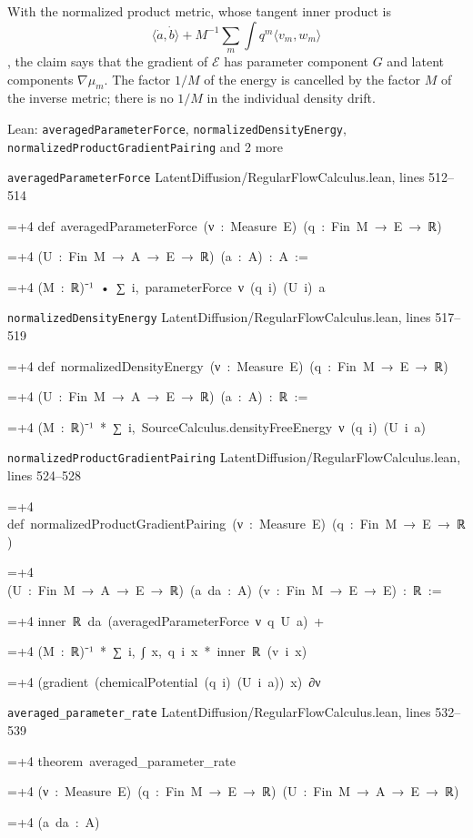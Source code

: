 \documentclass[11pt,a4paper]{report}
\newlength{\leancharwidth}
\newenvironment{leancode}{\par\smallskip\begingroup\ttfamily\footnotesize\raggedright
  \settowidth{\leancharwidth}{M}\setlength{\parskip}{0pt}\setlength{\parindent}{0pt}
  \frenchspacing}{\par\endgroup\smallskip}
\newcommand{\leanline}[2]{\hangindent=\dimexpr#1\leancharwidth+4\leancharwidth\relax
  \hangafter=1\noindent\hspace*{#1\leancharwidth}#2\par}
\newcommand{\leansource}[1]{\par{\footnotesize\color{leanmuted}#1}\par}
\begin{document}
With the normalized product metric, whose tangent inner product is \[\langle\dot a,\dot b\rangle+M^{-1}\sum_m\int q^m\langle v_m,w_m\rangle\], the claim says that the gradient of \(\mathcal E\) has parameter component \(G\) and latent components \(\nabla\mu_m\). The factor \(1/M\) of the energy is cancelled by the factor \(M\) of the inverse metric; there is no \(1/M\) in the individual density drift.

\begin{leanbox}{Lean: \texttt{averagedParameterForce}, \texttt{normalizedDensityEnergy}, \texttt{normalizedProductGradientPairing} and 2 more}
\leansource{\texttt{averagedParameterForce} \quad LatentDiffusion/\allowbreak{}RegularFlowCalculus.lean, lines 512–514}
\begin{leancode}
\leanline{0}{def\ averagedParameterForce\ (ν\ :\ Measure\ E)\ (q\ :\ Fin\ M\ →\ E\ →\ ℝ)}
\leanline{4}{(U\ :\ Fin\ M\ →\ A\ →\ E\ →\ ℝ)\ (a\ :\ A)\ :\ A\ :=}
\leanline{2}{(M\ :\ ℝ)⁻¹\ •\ ∑\ i,\ parameterForce\ ν\ (q\ i)\ (U\ i)\ a}
\end{leancode}
\leansource{\texttt{normalizedDensityEnergy} \quad LatentDiffusion/\allowbreak{}RegularFlowCalculus.lean, lines 517–519}
\begin{leancode}
\leanline{0}{def\ normalizedDensityEnergy\ (ν\ :\ Measure\ E)\ (q\ :\ Fin\ M\ →\ E\ →\ ℝ)}
\leanline{4}{(U\ :\ Fin\ M\ →\ A\ →\ E\ →\ ℝ)\ (a\ :\ A)\ :\ ℝ\ :=}
\leanline{2}{(M\ :\ ℝ)⁻¹\ *\ ∑\ i,\ SourceCalculus.densityFreeEnergy\ ν\ (q\ i)\ (U\ i\ a)}
\end{leancode}
\leansource{\texttt{normalizedProductGradientPairing} \quad LatentDiffusion/\allowbreak{}RegularFlowCalculus.lean, lines 524–528}
\begin{leancode}
\leanline{0}{def\ normalizedProductGradientPairing\ (ν\ :\ Measure\ E)\ (q\ :\ Fin\ M\ →\ E\ →\ ℝ)}
\leanline{4}{(U\ :\ Fin\ M\ →\ A\ →\ E\ →\ ℝ)\ (a\ da\ :\ A)\ (v\ :\ Fin\ M\ →\ E\ →\ E)\ :\ ℝ\ :=}
\leanline{2}{inner\ ℝ\ da\ (averagedParameterForce\ ν\ q\ U\ a)\ +}
\leanline{4}{(M\ :\ ℝ)⁻¹\ *\ ∑\ i,\ ∫\ x,\ q\ i\ x\ *\ inner\ ℝ\ (v\ i\ x)}
\leanline{6}{(gradient\ (chemicalPotential\ (q\ i)\ (U\ i\ a))\ x)\ ∂ν}
\end{leancode}
\leansource{\texttt{averaged\_\allowbreak{}parameter\_\allowbreak{}rate} \quad LatentDiffusion/\allowbreak{}RegularFlowCalculus.lean, lines 532–539}
\begin{leancode}
\leanline{0}{theorem\ averaged\_parameter\_rate}
\leanline{4}{(ν\ :\ Measure\ E)\ (q\ :\ Fin\ M\ →\ E\ →\ ℝ)\ (U\ :\ Fin\ M\ →\ A\ →\ E\ →\ ℝ)}
\leanline{4}{(a\ da\ :\ A)}

\end{leancode}
\end{leanbox}
\end{document}
